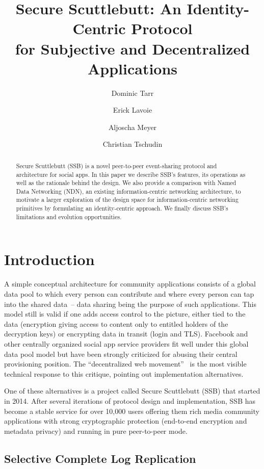 \documentclass[9pt,sigconf]{acmart}
\title[Secure Scuttlebutt: An Identity-Centric Protocol
       for Subjective and Decentralized Applications]{%
  Secure Scuttlebutt: An Identity-Centric Protocol \\
  for Subjective and Decentralized Applications
}
\author{Dominic Tarr}
\affiliation{ssb:@EMovhfIrFk4NihAKnRNhrf}
\author{Erick Lavoie}
\affiliation{McGill University, Montreal, Canada}
\author{Aljoscha Meyer}
\affiliation{TU Berlin, Germany}
\author{Christian Tschudin}
\affiliation{University of Basel, Switzerland}
\begin{document}
\begin{abstract}
  Secure Scuttlebutt (SSB) is a novel peer-to-peer event-sharing
  protocol and architecture for social apps. In this paper we describe
  SSB's features, its operations as well as the rationale behind the
  design. We also provide a comparison with Named Data Networking
  (NDN), an existing information-centric networking architecture, to
  motivate a larger exploration of the design space for
  information-centric networking primitives by formulating an
  identity-centric approach. We finally discuss SSB's limitations and
  evolution opportunities.
\end{abstract}

\maketitle



\section{Introduction}

A simple conceptual architecture for community applications consists
of a global data pool to which every person can contribute and where
every person can tap into the shared data~-- data sharing being the
purpose of such applications. This model still is valid if one adds
access control to the picture, either tied to the data (encryption
giving access to content only to entitled holders of the decryption
keys) or encrypting data in transit (login and TLS). Facebook and
other centrally organized social app service providers fit well under
this global data pool model but have been strongly criticized for
abusing their central provisioning position.  The ``decentralized web
movement''~\cite{decent-2018-aug} is the most visible technical
response to this critique, pointing out implementation alternatives.

One of these alternatives is a project called Secure Scuttlebutt (SSB)
that started in 2014. After several iterations of protocol design and
implementation, SSB has become a stable service for over 10,000 users
offering them rich media community applications with strong
cryptographic protection (end-to-end encryption and metadata privacy)
and running in pure peer-to-peer mode.

\subsection*{Selective Complete Log Replication}
\end{document}
